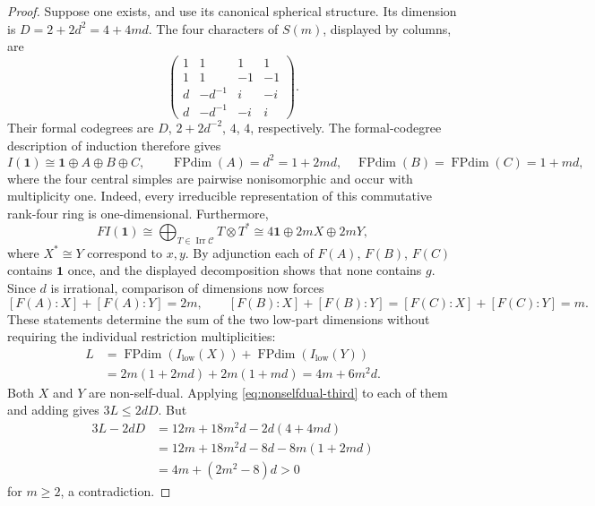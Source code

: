 \begin{proof}
Suppose one exists, and use its canonical spherical structure. Its dimension is
$D=2+2d^2=4+4md$. The four characters of $S(m)$, displayed by columns, are
\[
 \begin{pmatrix}
 1&1&1&1\\
 1&1&-1&-1\\
 d&-d^{-1}&i&-i\\
 d&-d^{-1}&-i&i
 \end{pmatrix}.
\]
Their formal codegrees are $D$, $2+2d^{-2}$, $4$, $4$, respectively.
The formal-codegree description of induction therefore gives
\[
 I(\mathbf1)\cong\mathbf1\oplus A\oplus B\oplus C,
 \qquad
 \operatorname{FPdim}(A)=d^2=1+2md,
 \quad
 \operatorname{FPdim}(B)=\operatorname{FPdim}(C)=1+md,
\]
where the four central simples are pairwise nonisomorphic and occur with
multiplicity one. Indeed, every irreducible representation of this commutative
rank-four ring is one-dimensional. Furthermore,
\[
 F I(\mathbf1)\cong
 \bigoplus_{T\in\operatorname{Irr}\mathcal C}T\otimes T^*
 \cong 4\mathbf1\oplus2mX\oplus2mY,
\]
where $X^*\cong Y$ correspond to $x,y$. By adjunction each of $F(A)$,
$F(B)$, $F(C)$ contains $\mathbf1$ once, and the displayed decomposition
shows that none contains $g$. Since $d$ is irrational, comparison of dimensions
now forces
\[
 [F(A):X]+[F(A):Y]=2m,\qquad
 [F(B):X]+[F(B):Y]=[F(C):X]+[F(C):Y]=m.
\]
These statements determine the sum of the two low-part dimensions without
requiring the individual restriction multiplicities:
\begin{align*}
 L&=\operatorname{FPdim}(I_{\mathrm{low}}(X))+
    \operatorname{FPdim}(I_{\mathrm{low}}(Y))\\
  &=2m(1+2md)+2m(1+md)=4m+6m^2d.
\end{align*}
Both $X$ and $Y$ are non-self-dual. Applying
\eqref{eq:nonselfdual-third} to each of them and adding gives $3L\leq2dD$.
But
\begin{align*}
 3L-2dD
 &=12m+18m^2d-2d(4+4md)\\
 &=12m+18m^2d-8d-8m(1+2md)\\
 &=4m+(2m^2-8)d>0
\end{align*}
for $m\geq2$, a contradiction.
\end{proof}

